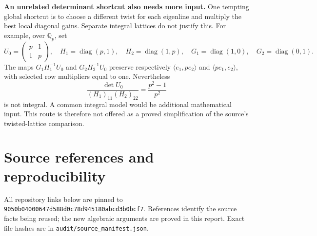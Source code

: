 \documentclass[11pt,letterpaper]{article}
\theoremstyle{remark}
\newcommand{\code}[1]{{\small\nolinkurl{#1}}}
\newcommand{\sectionlead}[1]{\needspace{6\baselineskip}\textbf{#1}}
\begin{document}
\sectionlead{An unrelated determinant shortcut also needs more input.}
One tempting global shortcut is to choose a different twist for each eigenline
and multiply the best local diagonal gains. Separate integral lattices do not
justify this. For example, over \(\mathbb Q_p\), set
\[
 U_0=\begin{pmatrix}p&1\\1&p\end{pmatrix},\quad
 H_1=\operatorname{diag}(p,1),\quad H_2=\operatorname{diag}(1,p),\quad
 G_1=\operatorname{diag}(1,0),\quad G_2=\operatorname{diag}(0,1).
\]
The maps \(G_1H_1^{-1}U_0\) and \(G_2H_2^{-1}U_0\) preserve respectively
\(\langle e_1,pe_2\rangle\) and \(\langle pe_1,e_2\rangle\), with selected
row multipliers equal to one. Nevertheless
\[
 \frac{\det U_0}{(H_1)_{11}(H_2)_{22}}=\frac{p^2-1}{p^2}
\]
is not integral. A common integral model would be additional mathematical input.
This route is therefore not offered as a proved simplification of the source's
twisted-lattice comparison.

\section{Source references and reproducibility}
\label{app:sources}

All repository links below are pinned to
\code{9050b04000647d588d0c78d945180abcd3b0bcf7}. References identify the
source facts being reused; the new algebraic arguments are proved in this report.
Exact file hashes are in \code{audit/source_manifest.json}.
\end{document}
